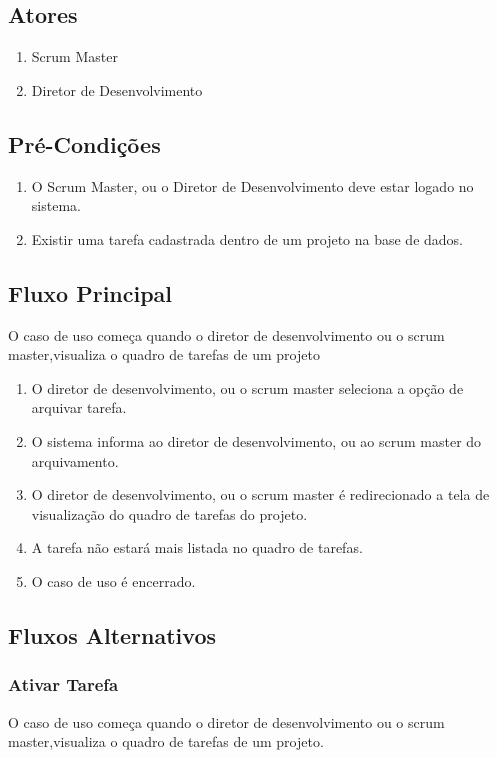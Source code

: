 \subsection{Atores}

\begin{enumerate}
  \item Scrum Master
  \item Diretor de Desenvolvimento 
\end{enumerate}

\subsection{Pré-Condições}
\begin{enumerate}
  \item O Scrum Master, ou o Diretor de Desenvolvimento deve estar logado no sistema.
  \item Existir uma tarefa cadastrada dentro de um projeto na base de dados.
\end{enumerate}

\subsection{Fluxo Principal}
O caso de uso começa quando o diretor de desenvolvimento ou o scrum master,visualiza o quadro de tarefas de um projeto

\begin{enumerate}
  \item O diretor de desenvolvimento, ou o scrum master seleciona a opção de arquivar tarefa.
  \item O sistema informa ao diretor de desenvolvimento, ou ao scrum master do arquivamento.
  \item O diretor de desenvolvimento, ou o scrum master é redirecionado a tela de visualização do quadro de tarefas do projeto.
  \item A tarefa não estará mais listada no quadro de tarefas.
  \item O caso de uso é encerrado.
\end{enumerate}

\subsection{Fluxos Alternativos}

\subsubsection{Ativar Tarefa}
O caso de uso começa quando o diretor de desenvolvimento ou o scrum master,visualiza o quadro de tarefas de um projeto.

